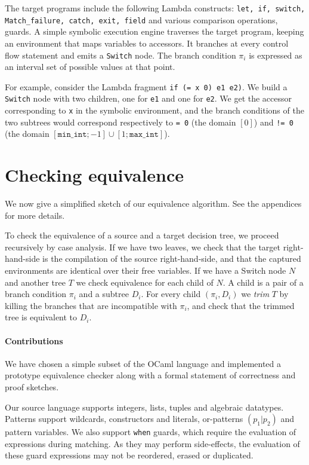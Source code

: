 \documentclass[12pt]{article}
\begin{document}
The target programs include the following Lambda constructs:
\texttt{let, if, switch, Match\_failure, catch, exit, field} and
various comparison operations, guards. A simple symbolic execution
engine traverses the target program, keeping an environment that maps
variables to accessors. It branches at every control flow statement
and emits a \texttt{Switch} node. The branch condition $\pi_i$ is
expressed as an interval set of possible values at that point.

For example, consider the Lambda fragment
%
\lstinline{if (= x 0) e1 e2)}.
%
We build a \lstinline{Switch} node with two children, one for
\lstinline{e1} and one for \lstinline{e2}. We get the accessor
corresponding to \lstinline{x} in the symbolic environment, and the
branch conditions of the two subtrees would correspond respectively to
\lstinline{= 0} (the domain $[0]$) and \lstinline{!= 0} (the domain
$[\mathtt{min\_int}; -1] \cup [1; \mathtt{max\_int}]$).

\section{Checking equivalence}

We now give a simplified sketch of our equivalence
algorithm. See the appendices for more details.

To check the equivalence of a source and a target decision tree,
we proceed recursively by case analysis.
%
If we have two leaves, we check that the target right-hand-side is the
compilation of the source right-hand-side, and that the captured
environments are identical over their free variables.
%
If we have a Switch node $N$ and another tree $T$ we check equivalence for
each child of $N$. A child is a pair of a branch condition
$\pi_i$ and a subtree $D_i$. For every child $(\pi_i, D_i)$ we
\emph{trim} $T$ by killing the branches that are incompatible with
$\pi_i$, and check that the trimmed tree is equivalent to $D_i$.

\paragraph{Contributions} We have chosen a simple subset of the OCaml
language and implemented a prototype equivalence checker along with
a formal statement of correctness and proof sketches.

Our source language supports integers, lists, tuples and algebraic
datatypes. Patterns support wildcards, constructors and literals,
or-patterns $(p_1 | p_2)$ and pattern variables. We also support
\texttt{when} guards, which require the evaluation of expressions
during matching. As they may perform side-effects, the evaluation of
these guard expressions may not be reordered, erased or duplicated.
\end{document}
